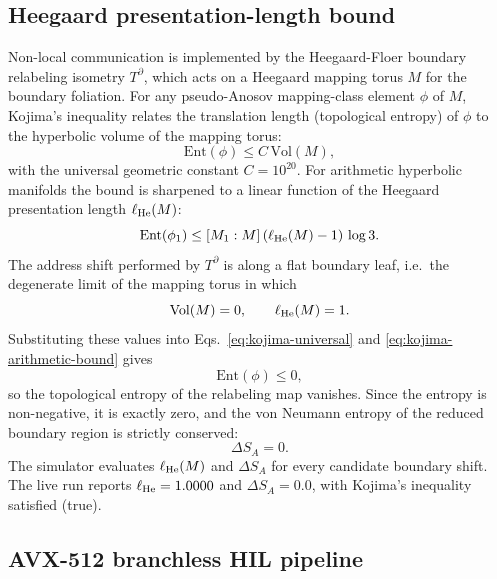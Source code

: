 \documentclass[aps,pra,10pt,onecolumn,superscriptaddress,nofootinbib,longbibliography,floatfix]{revtex4-2}
\newcommand{\ExoticHeegaardPresLength}{1.0000}%
\newcommand{\ExoticHeegaardEntropyChange}{0.0}%
\newcommand{\ExoticKojimaSatisfied}{true}%
\begin{document}
\subsection{Heegaard presentation-length bound}

Non-local communication is implemented by the Heegaard-Floer boundary relabeling isometry $T^\partial$, which acts on a Heegaard mapping torus $M$ for the boundary foliation.  For any pseudo-Anosov mapping-class element $\phi$ of $M$, Kojima's inequality relates the translation length (topological entropy) of $\phi$ to the hyperbolic volume of the mapping torus:
%
\begin{equation}
\label{eq:kojima-universal}
\mathrm{Ent}(\phi) \le C\, \mathrm{Vol}(M) ,
\end{equation}
%
with the universal geometric constant $C = 10^{20}$.  For arithmetic hyperbolic manifolds the bound is sharpened to a linear function of the Heegaard presentation length $\ell_{\rm He}(M)$:
%
\begin{equation}
\label{eq:kojima-arithmetic-bound}
\mathrm{Ent}(\phi_1) \le [M_1 : M]\, (\ell_{\rm He}(M) - 1)\, \log 3 .
\end{equation}
%
The address shift performed by $T^\partial$ is along a flat boundary leaf, i.e.~the degenerate limit of the mapping torus in which
%
\begin{equation}
\mathrm{Vol}(M) = 0, \qquad \ell_{\rm He}(M) = 1 .
\end{equation}
%
Substituting these values into Eqs.~\eqref{eq:kojima-universal} and \eqref{eq:kojima-arithmetic-bound} gives
%
\begin{equation}
\mathrm{Ent}(\phi) \le 0 ,
\end{equation}
%
so the topological entropy of the relabeling map vanishes.  Since the entropy is non-negative, it is exactly zero, and the von Neumann entropy of the reduced boundary region is strictly conserved:
%
\begin{equation}
\Delta S_A = 0 .
\end{equation}
%
The simulator evaluates $\ell_{\rm He}(M)$ and $\Delta S_A$ for every candidate boundary shift.  The live run reports $\ell_{\rm He} = \ExoticHeegaardPresLength{}$ and $\Delta S_A = \ExoticHeegaardEntropyChange{}$, with Kojima's inequality satisfied (\ExoticKojimaSatisfied{}).

\subsection{AVX-512 branchless HIL pipeline}
\end{document}
